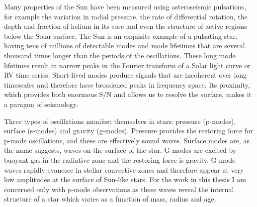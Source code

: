 Many properties of the Sun have been measured using asteroseismic pulsations,
for example the variation in radial pressure, the rate of differential
rotation, the depth and fraction of helium in its core and even the structure
of active regions below the Solar surface.
The Sun is an exquisite example of a pulsating star, having tens of millions
of detectable modes and mode lifetimes that are several thousand times longer
than the periods of the oscillations.
These long mode lifetimes result in narrow peaks in the Fourier transform of a
Solar light curve or RV time series.
Short-lived modes produce signals that are incoherent over long timescales and
therefore have broadened peaks in frequency space.
Its proximity, which provides both enormous S/N and allows us to resolve the
surface, makes it a paragon of seismology.

Three types of oscillations manifest themselves in stars: pressure (p-modes),
surface (s-modes) and gravity (g-modes).
Pressure provides the restoring force for p-mode oscillations, and these are
effectively sound waves.
Surface modes are, as the name suggests, waves on the surface of the star.
G-modes are excited by buoyant gas in the radiative zone and the restoring
force is gravity.
G-mode waves rapidly evanesce in stellar convective zones and therefore
appear at very low amplitudes at the surface of Sun-like stars.
For the work in this thesis I am concerned only with p-mode observations as
these waves reveal the internal structure of a star which varies as a function
of mass, radius and age.

